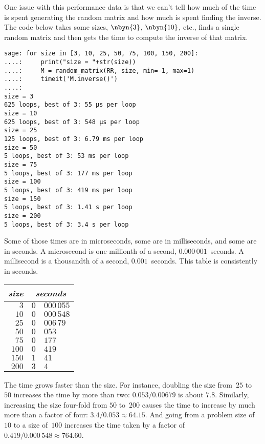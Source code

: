 One issue with this performance data is that
we can't tell
how much of the time is spent generating
the random matrix and how much is spent finding the inverse.
The code below takes some sizes, $\nbyn{3}$, $\nbyn{10}$, etc.,
finds a single random matrix and then 
gets the time to compute the inverse of that matrix.
\begin{lstlisting}
sage: for size in [3, 10, 25, 50, 75, 100, 150, 200]:
....:     print("size = "+str(size))
....:     M = random_matrix(RR, size, min=-1, max=1)
....:     timeit('M.inverse()')
....:     
size = 3
625 loops, best of 3: 55 μs per loop
size = 10
625 loops, best of 3: 548 μs per loop
size = 25
125 loops, best of 3: 6.79 ms per loop
size = 50
5 loops, best of 3: 53 ms per loop
size = 75
5 loops, best of 3: 177 ms per loop
size = 100
5 loops, best of 3: 419 ms per loop
size = 150
5 loops, best of 3: 1.41 s per loop
size = 200
5 loops, best of 3: 3.4 s per loop
\end{lstlisting}
Some of those times are in microseconds, some are in milliseconds, and some
are in seconds.
A microsecond is one-millionth of a second,
$0.000\,001$~seconds.
A millisecond is a thousandth of a second,
$0.001$~seconds.
This table is consistently in seconds.
\begin{center}
  \begin{tabular}{r|r@{.}l}
    \textit{size}     &\multicolumn{2}{c}{\textit{seconds}}  \\  \hline
    $3$      &$0$ &$000\,055$ \\
    $10$     &$0$ &$000\,548$ \\
    $25$     &$0$ &$006\,79$ \\
    $50$     &$0$ &$053$ \\
    $75$     &$0$ &$177$ \\
    $100$    &$0$ &$419$ \\
    $150$    &$1$ &$41$ \\
    $200$    &$3$ &$4$ 
  \end{tabular}
\end{center}
The time grows faster than the size.
For instance, doubling the size from~$25$ to~$50$ increases the time by
more than two: $0.053/0.00679$ is about $7.8$.
Similarly, increasing the size four-fold from $50$ to~$200$ causes the time to 
increase by much more than a factor of four: $3.4/0.053\approx 64.15$.
And going from a problem size of~$10$ to a size of~$100$ 
increases the time taken by a factor of $0.419/0.000\,548\approx 764.60$. 

